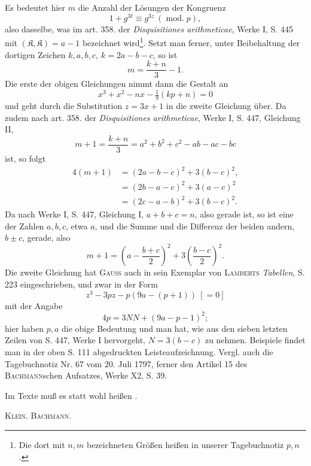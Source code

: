 \medskip\begingroup\small
\indent Es bedeutet hier \(m\) die Anzahl der Lösungen der Kongruenz
\[
1+g^{3t}\equiv g^{3z}\ (\operatorname{mod.}p),
\]
\noindent also dasselbe, was im art. 358. der \textit{Disquisitiones arithmeticae}, Werke I, S. 445 mit \((\mathfrak K,\mathfrak K)=a-1\) bezeichnet wird\footnote{Die dort mit \(n,m\) bezeichneten Größen heißen in unserer Tagebuchnotiz \(p,n\).}. Setzt man ferner, unter Beibehaltung der dortigen Zeichen \(k,a,b,c,\ k=2a-b-c\), so ist
\[
m=\frac{k+n}{3}-1.
\]
\noindent Die erste der obigen Gleichungen nimmt dann die Gestalt an
\[
x^3+x^2-nx-\tfrac19(kp+n)=0
\]
\noindent und geht durch die Substitution \(z=3x+1\) in die zweite Gleichung über. Da zudem nach art. 358. der \textit{Disquisitiones arithmeticae}, Werke I, S. 447, Gleichung II,
\[
m+1=\frac{k+n}{3}=a^2+b^2+c^2-ab-ac-bc
\]
\noindent ist, so folgt
\[
\begin{aligned}
4(m+1)&=(2a-b-c)^2+3(b-c)^2,\\
&=(2b-a-c)^2+3(a-c)^2\\
&=(2c-a-b)^2+3(b-c)^2.
\end{aligned}
\]
\noindent Da nach Werke I, S. 447, Gleichung I, \(a+b+c=n\), also gerade ist, so ist eine der Zahlen \(a,b,c\), etwa \(a\), und die Summe und die Differenz der beiden andern, \(b\pm c\), gerade, also
\[
m+1=\left(a-\frac{b+c}{2}\right)^2+3\left(\frac{b-c}{2}\right)^2.
\]
\noindent Die zweite Gleichung hat \textsc{Gauss} auch in sein Exemplar von \textsc{Lamberts} \textit{Tabellen}, S. 223 eingeschrieben, und zwar in der Form
\[
z^3-3pz-p(9a-(p+1))\ [=0]
\]
\noindent mit der Angabe
\[
4p=3NN+(9a-p-1)^2;
\]
\noindent hier haben \(p,a\) die obige Bedeutung und man hat, wie aus den sieben letzten Zeilen von S. 447, Werke I hervorgeht, \(N=3(b-c)\) zu nehmen. Beispiele findet man in der oben S. 111 abgedruckten Leisteaufzeichnung. Vergl. auch die Tagebuchnotiz Nr. 67 vom 20. Juli 1797, ferner den Artikel 15 des \textsc{Bachmann}schen Aufsatzes, Werke X2, S. 39.

\indent Im Texte muß es statt  wohl heißen .
\par\noindent\hfill\textsc{Klein. Bachmann.}
\par\endgroup
